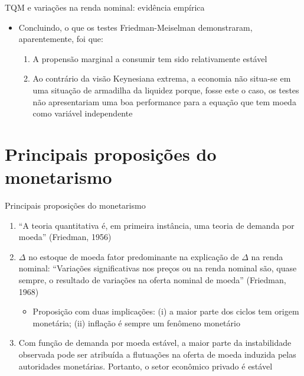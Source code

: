 \documentclass[10pt]{beamer}
\begin{document}
\begin{frame}{TQM e variações na renda nominal: evidência empírica}
    \begin{itemize}
        \item Concluindo, o que os testes Friedman-Meiselman demonstraram, aparentemente, foi que:
        \bigskip
        \begin{enumerate}
            \item A propensão marginal a consumir tem sido relativamente estável
            \bigskip
            \item Ao contrário da visão Keynesiana extrema, a economia não situa-se em uma situação de armadilha da liquidez porque, fosse este o caso, os testes não apresentariam uma boa performance para a equação que tem moeda como variável independente
        \end{enumerate}
    \end{itemize}
\end{frame}

\section{Principais proposições do monetarismo}
\begin{frame}{Principais proposições do monetarismo}
    \begin{enumerate}
        \item ``A teoria quantitativa é, em primeira instância, uma teoria de demanda por moeda'' (Friedman, 1956)
        \bigskip
        \item $\Delta$ no estoque de moeda fator predominante na explicação de $\Delta$ na renda nominal: ``Variações significativas nos preços ou na renda nominal são, quase sempre, o resultado de variações na oferta nominal de moeda'' (Friedman, 1968)
        \bigskip
        \begin{itemize}
            \item Proposição com duas implicações: (i) a maior parte dos ciclos tem origem monetária; (ii) inflação é sempre um fenômeno monetário
        \end{itemize}
        \bigskip
        \item Com função de demanda por moeda estável, a maior parte da instabilidade observada pode ser atribuída a flutuações na oferta de moeda induzida pelas autoridades monetárias. Portanto, o setor econômico privado é estável
    \end{enumerate}
\end{frame}
\end{document}
